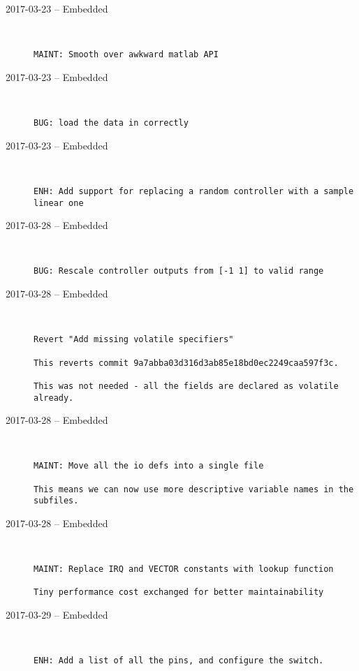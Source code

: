 \begin{description}
  \item[2017-03-23 -- Embedded] \hfill \
\begin{lstlisting}
MAINT: Smooth over awkward matlab API
\end{lstlisting}


  \item[2017-03-23 -- Embedded] \hfill \
\begin{lstlisting}
BUG: load the data in correctly
\end{lstlisting}


  \item[2017-03-23 -- Embedded] \hfill \
\begin{lstlisting}
ENH: Add support for replacing a random controller with a sample linear one
\end{lstlisting}


  \item[2017-03-28 -- Embedded] \hfill \
\begin{lstlisting}
BUG: Rescale controller outputs from [-1 1] to valid range
\end{lstlisting}


  \item[2017-03-28 -- Embedded] \hfill \
\begin{lstlisting}
Revert "Add missing volatile specifiers"

This reverts commit 9a7abba03d316d3ab85e18bd0ec2249caa597f3c.

This was not needed - all the fields are declared as volatile already.
\end{lstlisting}


  \item[2017-03-28 -- Embedded] \hfill \
\begin{lstlisting}
MAINT: Move all the io defs into a single file

This means we can now use more descriptive variable names in the subfiles.
\end{lstlisting}


  \item[2017-03-28 -- Embedded] \hfill \
\begin{lstlisting}
MAINT: Replace IRQ and VECTOR constants with lookup function

Tiny performance cost exchanged for better maintainability
\end{lstlisting}


  \item[2017-03-29 -- Embedded] \hfill \
\begin{lstlisting}
ENH: Add a list of all the pins, and configure the switch.
\end{lstlisting}



\end{description}
